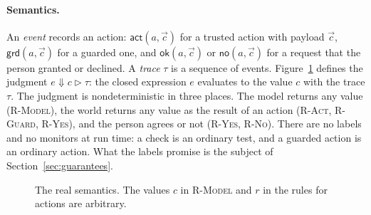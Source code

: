 \documentclass[acmsmall,nonacm,screen]{acmart}
\newcommand{\kw}[1]{\mathsf{#1}}
\newcommand{\model}[1]{\kw{model}(#1)}
\newcommand{\act}[2]{\kw{act}\;#1(#2)}
\newcommand{\grd}[2]{\kw{act}_\pi\;#1(#2)}
\newcommand{\ask}[5]{\kw{ask}\;#1(#2)\;\kw{as}\;#3\;\kw{then}\;#4\;\kw{else}\;#5}
\newcommand{\chk}[5]{\kw{check}\;#1\;\kw{as}\;#2.\,#3\;\kw{then}\;#4\;\kw{else}\;#5}
\newcommand{\letin}[2]{\kw{let}\;#1 = #2\;\kw{in}}
\newcommand{\ite}[3]{\kw{if}\;#1\;\kw{then}\;#2\;\kw{else}\;#3}
\newcommand{\iter}[4]{\kw{iter}\;#1\;\kw{from}\;#2\;\kw{as}\;#3.\;#4}
\newcommand{\ev}[3]{#1 \Downarrow #2 \triangleright #3}
\newcommand{\sem}[1]{[\![#1]\!]}
\newcommand{\eps}{\varepsilon}
\begin{document}
\paragraph{Semantics.} An \emph{event} records an action: $\kw{act}(a, \vec c)$ for a trusted
action with payload $\vec c$, $\kw{grd}(a, \vec c)$ for a guarded one, and
$\kw{ok}(a, \vec c)$ or $\kw{no}(a, \vec c)$ for a request that the person granted or
declined. A \emph{trace} $\tau$ is a sequence of events. Figure~\ref{fig:real} defines the
judgment $\ev{e}{c}{\tau}$: the closed expression $e$ evaluates to the value $c$ with the
trace $\tau$. The judgment is nondeterministic in three places. The model returns any value
(\textsc{R-Model}), the world returns any value as the result of an action (\textsc{R-Act},
\textsc{R-Guard}, \textsc{R-Yes}), and the person agrees or not (\textsc{R-Yes},
\textsc{R-No}). There are no labels and no monitors at run time: a check is an ordinary test,
and a guarded action is an ordinary action. What the labels promise is the subject of
Section~\ref{sec:guarantees}.

\begin{figure}[t]
\caption{The real semantics. The values $c$ in \textsc{R-Model} and $r$ in the rules for
actions are arbitrary.}
\label{fig:real}
\end{figure}
\end{document}
